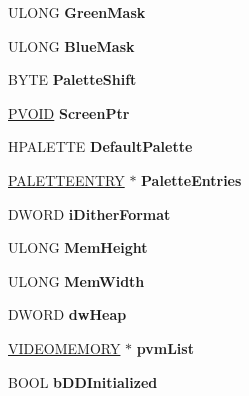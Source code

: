 \begin{DoxyCompactItemize}
U\+L\+O\+NG {\bfseries Green\+Mask}
\item 
\mbox{\label{struct___p_d_e_v_a54aa0287127719b116c8fc1fc0da485e}} 
U\+L\+O\+NG {\bfseries Blue\+Mask}
\item 
\mbox{\label{struct___p_d_e_v_a11e40b5c4af7cc1cf77c8c07889a8fef}} 
B\+Y\+TE {\bfseries Palette\+Shift}
\item 
\mbox{\label{struct___p_d_e_v_a829f69d3f55d98bcf07fa3ac21a53189}} 
\hyperlink{interfacevoid}{P\+V\+O\+ID} {\bfseries Screen\+Ptr}
\item 
\mbox{\label{struct___p_d_e_v_af3a09b971bb18fa8d80a11958160130d}} 
H\+P\+A\+L\+E\+T\+TE {\bfseries Default\+Palette}
\item 
\mbox{\label{struct___p_d_e_v_a216f916363c04cfe04bcc1adef2b7e84}} 
\hyperlink{structtag_p_a_l_e_t_t_e_e_n_t_r_y}{P\+A\+L\+E\+T\+T\+E\+E\+N\+T\+RY} $\ast$ {\bfseries Palette\+Entries}
\item 
\mbox{\label{struct___p_d_e_v_a48d1aa7c4eb77032bb03c463ac48e5dd}} 
D\+W\+O\+RD {\bfseries i\+Dither\+Format}
\item 
\mbox{\label{struct___p_d_e_v_ac9e94254591e6163e1e8e10fc6e92dd6}} 
U\+L\+O\+NG {\bfseries Mem\+Height}
\item 
\mbox{\label{struct___p_d_e_v_ab9d0b8c64b3b9014ba17497c6eae365a}} 
U\+L\+O\+NG {\bfseries Mem\+Width}
\item 
\mbox{\label{struct___p_d_e_v_a4680014e2c5555941d1018a67669e6b3}} 
D\+W\+O\+RD {\bfseries dw\+Heap}
\item 
\mbox{\label{struct___p_d_e_v_a6784878dd637e22476de288aadd0f182}} 
\hyperlink{struct___v_i_d_e_o_m_e_m_o_r_y}{V\+I\+D\+E\+O\+M\+E\+M\+O\+RY} $\ast$ {\bfseries pvm\+List}
\item 
\mbox{\label{struct___p_d_e_v_ac8b740f0bbbf8d831af73eb00c6522ed}} 
B\+O\+OL {\bfseries b\+D\+D\+Initialized}
\item 

\end{DoxyCompactItemize}
